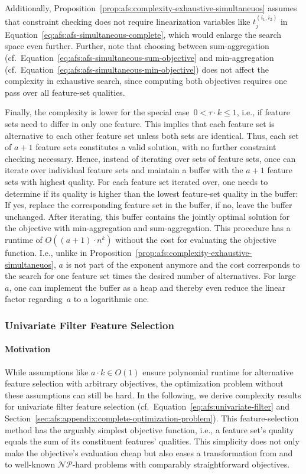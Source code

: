 \documentclass{article}
\theoremstyle{definition}
\begin{document}
Additionally, Proposition~\ref{prop:afs:complexity-exhaustive-simultaneuos} assumes that constraint checking does not require linearization variables like $t^{(i_1,i_2)}_j$ in Equation~\ref{eq:afs:afs-simultaneous-complete}, which would enlarge the search space even further.
Further, note that choosing between sum-aggregation (cf.~Equation~\ref{eq:afs:afs-simultaneous-sum-objective} and min-aggregation (cf.~Equation~\ref{eq:afs:afs-simultaneous-min-objective}) does not affect the complexity in exhaustive search, since computing both objectives requires one pass over all feature-set qualities.

Finally, the complexity is lower for the special case~$0 < \tau \cdot k \leq 1$, i.e., if feature sets need to differ in only one feature.
This implies that each feature set is alternative to each other feature set unless both sets are identical.
Thus, each set of $a + 1$ feature sets constitutes a valid solution, with no further constraint checking necessary.
Hence, instead of iterating over sets of feature sets, once can iterate over individual feature sets and maintain a buffer with the $a + 1$ feature sets with highest quality.
For each feature set iterated over, one needs to determine if its quality is higher than the lowest feature-set quality in the buffer:
If yes, replace the corresponding feature set in the buffer, if no, leave the buffer unchanged.
After iterating, this buffer contains the jointly optimal solution for the objective with min-aggregation and sum-aggregation.
This procedure has a runtime of $O((a + 1) \cdot n^k)$ without the cost for evaluating the objective function.
I.e., unlike in Proposition~\ref{prop:afs:complexity-exhaustive-simultaneuos}, $a$ is not part of the exponent anymore and the cost corresponds to the search for one feature set times the desired number of alternatives.
For large $a$, one can implement the buffer as a heap and thereby even reduce the linear factor regarding~$a$ to a logarithmic one.

\subsubsection{Univariate Filter Feature Selection}
\label{sec:afs:appendix:complexity:uni}

\paragraph{Motivation}

While assumptions like $a \cdot k \in O(1)$ ensure polynomial runtime for alternative feature selection with arbitrary objectives, the optimization problem without these assumptions can still be hard.
In the following, we derive complexity results for univariate filter feature selection (cf.~Equation~\ref{eq:afs:univariate-filter} and Section~\ref{sec:afs:appendix:complete-optimization-problem}).
This feature-selection method has the arguably simplest objective function, i.e., a feature set's quality equals the sum of its constituent features' qualities.
This simplicity does not only make the objective's evaluation cheap but also eases a transformation from and to well-known $\mathcal{NP}$-hard problems with comparably straightforward objectives.
\end{document}
